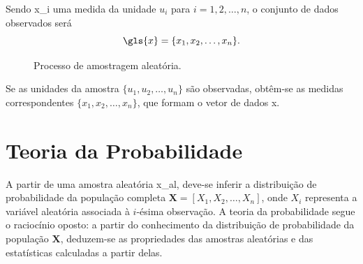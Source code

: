 Sendo \gls{x_i} uma medida da unidade $u_i$ para $i = 1, 2, \ldots, n$, o conjunto de dados observados será
\begin{equation}
    \gls{x} = \{x_1, x_2, \ldots, x_n\}.
\end{equation}
\begin{figure}[ht!]
\centering
\caption{Processo de amostragem aleatória.}
\label{fig:amoale}
\end{figure}
Se as unidades da amostra $\{u_1, u_2, \ldots, u_n\}$ são observadas, obtêm-se as medidas correspondentes $\{x_1, x_2, \ldots, x_n\}$, que formam o vetor de dados \gls{x}.

\section{Teoria da Probabilidade}
\label{sec:teopro}
A partir de uma amostra aleatória \gls{x_al}, deve-se inferir a distribuição de probabilidade da população completa $\mathbf{X} = [X_1, X_2, \ldots, X_n]$, onde $X_i$ representa a variável aleatória associada à $i$-ésima observação. A teoria da probabilidade segue o raciocínio oposto: a partir do conhecimento da distribuição de probabilidade da população $\mathbf{X}$, deduzem-se as propriedades das amostras aleatórias e das estatísticas calculadas a partir delas.

